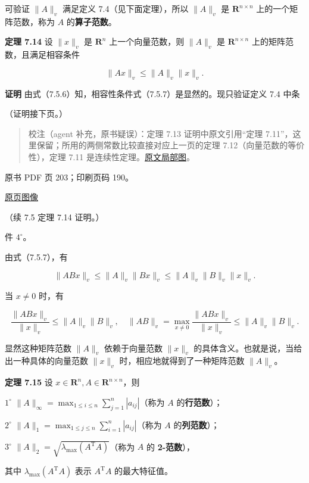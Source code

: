 可验证 \(\|A\|_v\) 满足定义 7.4（见下面定理），所以 \(\|A\|_v\) 是 \(\mathbf R^{n\times n}\) 上的一个矩阵范数，称为 \(A\) 的\textbf{算子范数}。

\textbf{定理 7.14} 设 \(\|x\|_v\) 是 \(\mathbf R^n\) 上一个向量范数，则 \(\|A\|_v\) 是 \(\mathbf R^{n\times n}\) 上的矩阵范数，且满足相容条件

\[
\|Ax\|_v\leqslant\|A\|_v\|x\|_v.
\tag{7.5.7}
\]

\textbf{证明} 由式（7.5.6）知，相容性条件式（7.5.7）是显然的。现只验证定义 7.4 中条

（证明接下页。）

\begin{quote}
校注（agent 补充，原书疑误）：定理 7.13 证明中原文引用``定理 7.11''，这里保留；所用的两侧常数比较直接对应上一页的定理 7.12（向量范数的等价性），定理 7.11 是连续性定理。\href{verified/assets/ch07b/202-reference.png}{原文局部图}。
\end{quote}

\clearpage

原书 PDF 页 203；印刷页码 190。

\href{source-images/pdf-203.jpeg}{原页图像}

（续 7.5 定理 7.14 证明。）

件 \(4^\circ\)。

由式（7.5.7），有

\[
\|ABx\|_v\leqslant\|A\|_v\|Bx\|_v\leqslant\|A\|_v\|B\|_v\|x\|_v.
\]

当 \(x\neq0\) 时，有

\[
\frac{\|ABx\|_v}{\|x\|_v}\leqslant\|A\|_v\|B\|_v,\quad
\|AB\|_v=\max_{x\neq0}\frac{\|ABx\|_v}{\|x\|_v}\leqslant\|A\|_v\|B\|_v.
\]

显然这种矩阵范数 \(\|A\|_v\) 依赖于向量范数 \(\|x\|_v\) 的具体含义。也就是说，当给出一种具体的向量范数 \(\|x\|_v\) 时，相应地就得到了一种矩阵范数 \(\|A\|_v\)。

\textbf{定理 7.15} 设 \(x\in\mathbf R^n,A\in\mathbf R^{n\times n}\)，则

\(1^\circ\) \(\|A\|_\infty=\max_{1\leqslant i\leqslant n}\sum_{j=1}^{n}|a_{ij}|\)（称为 \(A\) 的\textbf{行范数}）；

\(2^\circ\) \(\|A\|_1=\max_{1\leqslant j\leqslant n}\sum_{i=1}^{n}|a_{ij}|\)（称为 \(A\) 的\textbf{列范数}）；

\(3^\circ\) \(\|A\|_2=\sqrt{\lambda_{\max}(A^{\mathrm T}A)}\)（称为 \(A\) 的 \textbf{2-范数}），

其中 \(\lambda_{\max}(A^{\mathrm T}A)\) 表示 \(A^{\mathrm T}A\) 的最大特征值。

